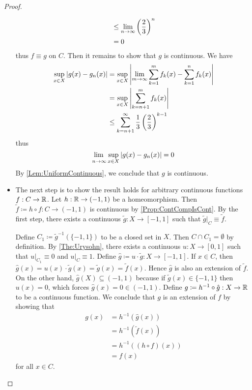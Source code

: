 \documentclass[screen,single]{techreport}
\numberwithin{equation}{section}
\begin{document}
\begin{proof}
\begin{itemize}
\begin{align*}
			& \le \lim_{n \to \infty} \left({\frac{2}{3}}\right)^n \\
			& = 0
		\end{align*}
		thus $f \equiv g$ on $C$.
		Then it remains to show that $g$ is continuous.
		We have
		\begin{align*}
			\sup_{x \in X} \left|{ g(x) - g_n(x) }\right| & = \sup_{x \in X} \left|{ \lim_{m \to \infty} \sum_{k=1}^m f_k(x) - \sum_{k=1}^n f_k(x) }\right| \\
			& = \sup_{x \in X} \left|{ \sum_{k=n+1}^m f_k(x) }\right| \\
			& \le \sum_{k=n+1}^\infty \frac{1}{3} \left({\frac{2}{3}}\right)^{k-1}
		\end{align*}
		thus
		\[
		\adjustlimits \lim_{n \to \infty} \sup_{x \in X} \abs{g(x) - g_n(x)} = 0
		\]
		By \cref{Lem:UniformContinuous}, we conclude that $g$ is continuous.
		
		\item The next step is to show the result holds for arbitrary continuous functions $f : C \to \mathbb{R}$.
		Let $h : \mathbb{R} \to (-1,1)$ be a homeomorphism.
		Then $\tilde{f} \coloneqq h \circ f : C \to (-1,1)$ is continuous by \cref{Prop:ContCompIsCont}.
		By the first step, there exists a continuous $\tilde{g} : X \to [-1,1]$ such that $\tilde{g}|_C \equiv \tilde{f}$.
		
		Define $C_1 \coloneqq \tilde{g}^{-1}(\{-1,1\})$ to be a closed set in $X$.
		Then $C \cap C_1 = \emptyset$ by definition.
		By \cref{The:Urysohn}, there exists a continuous $u : X \to [0,1]$ such that $u|_{C_1} \equiv 0$ and $u|_C \equiv 1$.
		Define $\hat{g} \coloneqq u \cdot \tilde{g} : X \to [-1,1]$.
		If $x \in C$, then $\hat{g}(x) = u(x) \cdot \tilde{g}(x) = \tilde{g}(x) = \tilde{f}(x)$.
		Hence $\hat{g}$ is also an extension of $\tilde{f}$.
		On the other hand, $\hat{g}(X) \subseteq (-1,1)$ because if $\tilde{g}(x) \in \{-1,1\}$ then $u(x) = 0$, which forces $\hat{g}(x) = 0 \in (-1,1)$.
		Define $g \coloneqq h^{-1} \circ \hat{g} : X \to \mathbb{R}$ to be a continuous function.
		We conclude that $g$ is an extension of $f$ by showing that
		\begin{align*}
			g(x) & = h^{-1}(\hat{g}(x)) \\
			& = h^{-1}(\tilde{f}(x)) \\
			& = h^{-1}((h \circ f)(x)) \\
			& = f(x)
		\end{align*}
		for all $x \in C$.
	\end{itemize}
\end{proof}
\end{document}
